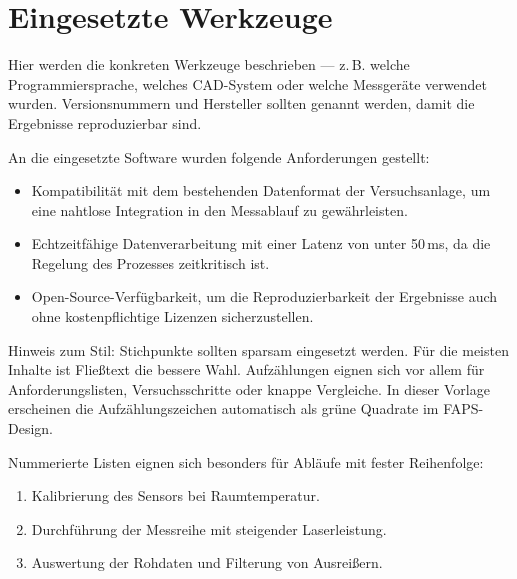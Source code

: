 \section{Eingesetzte Werkzeuge}

Hier werden die konkreten Werkzeuge beschrieben — z.\,B. welche Programmiersprache, welches CAD-System oder welche Messgeräte verwendet wurden. Versionsnummern und Hersteller sollten genannt werden, damit die Ergebnisse reproduzierbar sind.

An die eingesetzte Software wurden folgende Anforderungen gestellt:

\begin{itemize}
    \item Kompatibilität mit dem bestehenden Datenformat der Versuchsanlage, um eine nahtlose Integration in den Messablauf zu gewährleisten.
    \item Echtzeitfähige Datenverarbeitung mit einer Latenz von unter 50\,ms, da die Regelung des Prozesses zeitkritisch ist.
    \item Open-Source-Verfügbarkeit, um die Reproduzierbarkeit der Ergebnisse auch ohne kostenpflichtige Lizenzen sicherzustellen.
\end{itemize}

Hinweis zum Stil: Stichpunkte sollten sparsam eingesetzt werden. Für die meisten Inhalte ist Fließtext die bessere Wahl. Aufzählungen eignen sich vor allem für Anforderungslisten, Versuchsschritte oder knappe Vergleiche. In dieser Vorlage erscheinen die Aufzählungszeichen automatisch als grüne Quadrate im \ac{FAPS}-Design.

Nummerierte Listen eignen sich besonders für Abläufe mit fester Reihenfolge:

\begin{enumerate}
    \item Kalibrierung des Sensors bei Raumtemperatur.
    \item Durchführung der Messreihe mit steigender Laserleistung.
    \item Auswertung der Rohdaten und Filterung von Ausreißern.
\end{enumerate}